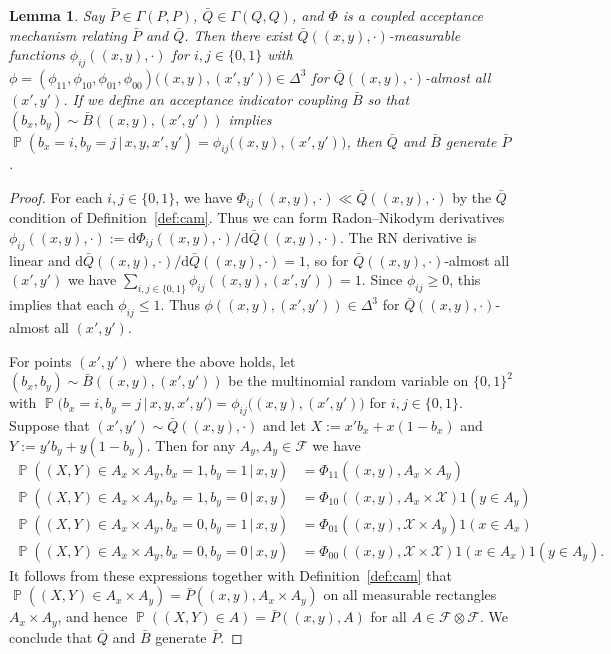 \documentclass[aihp]{imsart}
\theoremstyle{plain}
\newtheorem{lemma}[theorem]{Lemma}
\theoremstyle{remark}
\theoremstyle{definition} \newtheorem{example}{Example}
\newcommand{\eq}[1]{\begin{align*}#1\end{align*}} %
\renewcommand{\P}{\operatorname{\mathbb{P}}}
\newcommand{\scrF}{\mathscr{F}}
\newcommand{\calX}{\mathcal{X}}
\newcommand{\g}{\, | \,}
\newcommand{\scrFp}{\scrF \otimes \scrF}
\newcommand{\bp}{\bar P}
\newcommand{\bq}{\bar Q}
\newcommand{\bb}{\bar B}
\newcommand{\xy}{(x,y)}
\newcommand{\xyp}{(x',y')}
\newcommand{\bxy}{(b_x,b_y)}
\newcommand{\axy}{A_x \times A_y}
\begin{document}
\begin{lemma}
\label{lem:rnderivs} Say $\bp \in \Gamma(P,P)$, $\bq \in \Gamma(Q,Q)$, and $\Phi$ is a coupled
acceptance mechanism relating $\bp$ and $\bq$. Then there exist $\bq(\xy,\cdot)$-measurable
functions $\phi_{ij}(\xy, \cdot)$ for $i,j \in \{0,1\}$ with $\phi = (\phi_{11}, \phi_{10},
\phi_{01}, \phi_{00})\big(\xy, \xyp \big) \in \Delta^3$ for $\bq(\xy,\cdot)$-almost all $\xyp$. If
we define an acceptance indicator coupling $\bb$ so that $(b_x, b_y) \sim \bb(\xy, \xyp)$ implies
${\P ( b_x = i, b_y = j \g x,y,x',y') = \phi_{ij}\big( \xy, \xyp \big)}$, then $\bq$ and $\bb$
generate $\bp$.
\end{lemma}

\begin{proof}
For each $i,j \in \{0,1\}$, we have $\Phi_{ij}(\xy, \cdot) \ll \bq(\xy, \cdot)$ by the $\bq$
condition of  Definition~\ref{def:cam}. Thus we can form Radon--Nikodym derivatives
$\phi_{ij}(\xy, \cdot) := \mathrm{d} \Phi_{ij}(\xy, \cdot) / \mathrm{d} \bq(\xy, \cdot)$. The RN
derivative is linear and $\mathrm{d} \bq (\xy, \cdot) / \mathrm{d} \bq(\xy, \cdot) = 1$, so for
$\bq(\xy, \cdot)$-almost all $\xyp$ we have $\sum_{i,j \in \{0,1\} } \phi_{ij}(\xy,\xyp) = 1$. Since
$\phi_{ij} \geq 0$, this implies that each $\phi_{ij} \leq 1$. Thus $\phi(\xy, \xyp) \in \Delta^3$
for $\bq(\xy, \cdot)$-almost all $\xyp$.

For points $\xyp$ where the above holds, let $\bxy \sim \bb(\xy, \xyp)$ be the multinomial random
variable on $\{0,1\}^2$ with $\P\big( b_x = i, b_y = j \g x,y,x',y' \big) = \phi_{ij}\big( \xy, \xyp
\big)$ for $i,j \in \{0,1\}$. Suppose that $\xyp \sim \bq(\xy, \cdot)$ and let $X := x' b_x + x
(1-b_x)$ and $Y := y' b_y + y (1-b_y)$. Then for any $A_y, A_y \in \scrF$ we have
\eq{
	\P((X,Y) \in \axy, b_x=1, b_y=1 \g x,y)	&= \Phi_{11}(\xy, \axy) \\
	\P((X,Y) \in \axy, b_x=1, b_y=0 \g x,y) &= \Phi_{10}(\xy, A_x \times \calX) 1(y \in A_y) \\
	\P((X,Y) \in \axy, b_x=0, b_y=1 \g x,y) &= \Phi_{01}(\xy, \calX \times A_y) 1(x \in A_x) \\
	\P((X,Y) \in \axy, b_x=0, b_y= 0 \g x,y) &= \Phi_{00}(\xy, \calX \times \calX) 1(x \in A_x)1(y \in A_y).
}
It follows from these expressions together with Definition~\ref{def:cam} that
${ \P((X,Y) \in \axy) = \bp(\xy, \axy) } $ on all measurable rectangles $\axy$, and hence
$\P((X,Y) \in A) = \bp(\xy, A)$ for all ${A \in \scrFp}$. We conclude that $\bq$ and $\bb$ generate $\bp$.
\end{proof}
\end{document}
